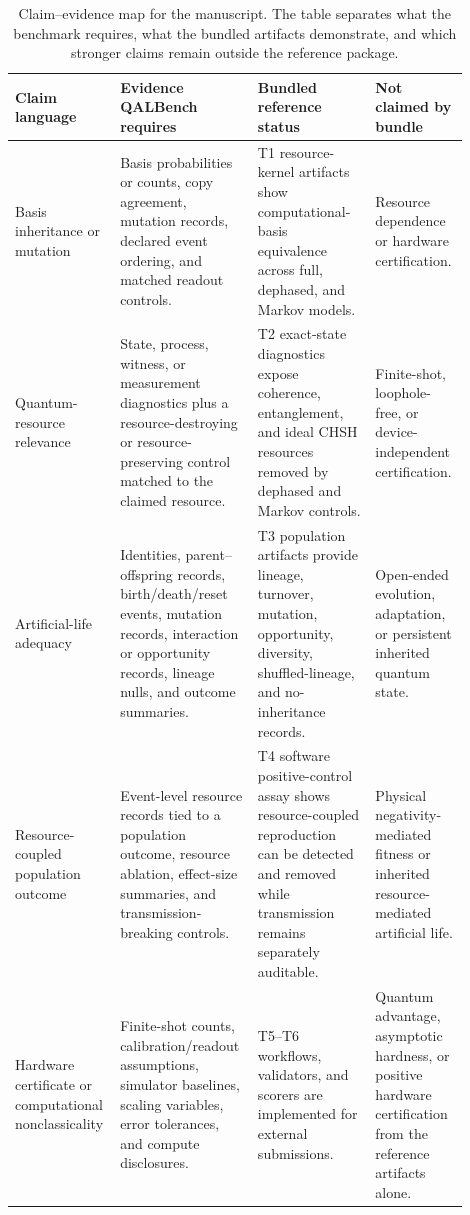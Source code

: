 \documentclass[11pt]{article}
\begin{document}
\begin{table}[t]
\centering
\scriptsize
\setlength{\tabcolsep}{3.5pt}
\renewcommand{\arraystretch}{1.15}
\begin{tabular}{P{0.19\linewidth}P{0.28\linewidth}P{0.25\linewidth}P{0.18\linewidth}}
\toprule
\textbf{Claim language} & \textbf{Evidence QALBench requires} & \textbf{Bundled reference status} & \textbf{Not claimed by bundle} \\
\midrule
Basis inheritance or mutation & Basis probabilities or counts, copy agreement, mutation records, declared event ordering, and matched readout controls. & T1 resource-kernel artifacts show computational-basis equivalence across full, dephased, and Markov models. & Resource dependence or hardware certification. \\
\addlinespace
Quantum-resource relevance & State, process, witness, or measurement diagnostics plus a resource-destroying or resource-preserving control matched to the claimed resource. & T2 exact-state diagnostics expose coherence, entanglement, and ideal CHSH resources removed by dephased and Markov controls. & Finite-shot, loophole-free, or device-independent certification. \\
\addlinespace
Artificial-life adequacy & Identities, parent--offspring records, birth/death/reset events, mutation records, interaction or opportunity records, lineage nulls, and outcome summaries. & T3 population artifacts provide lineage, turnover, mutation, opportunity, diversity, shuffled-lineage, and no-inheritance records. & Open-ended evolution, adaptation, or persistent inherited quantum state. \\
\addlinespace
Resource-coupled population outcome & Event-level resource records tied to a population outcome, resource ablation, effect-size summaries, and transmission-breaking controls. & T4 software positive-control assay shows resource-coupled reproduction can be detected and removed while transmission remains separately auditable. & Physical negativity-mediated fitness or inherited resource-mediated artificial life. \\
\addlinespace
Hardware certificate or computational nonclassicality & Finite-shot counts, calibration/readout assumptions, simulator baselines, scaling variables, error tolerances, and compute disclosures. & T5--T6 workflows, validators, and scorers are implemented for external submissions. & Quantum advantage, asymptotic hardness, or positive hardware certification from the reference artifacts alone. \\
\bottomrule
\end{tabular}
\caption{Claim--evidence map for the manuscript. The table separates what the benchmark requires, what the bundled artifacts demonstrate, and which stronger claims remain outside the reference package.}
\label{tab:claim-evidence}
\end{table}
\end{document}
